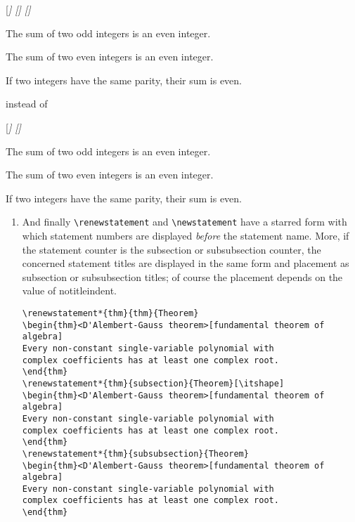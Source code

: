 \documentclass[english,ColorTheme=Red,FontSize=10pt]{tango}
\newcommand\TO[1]{\textsf{#1}}
\begin{document}
\begin{example}[Examples]
\begin{enumerate}[resume]
\end{enumerate}
[\itshape]
[\itshape]
[\itshape]
\setcounter{thm}{0}
\begin{propo}
The sum of two odd integers is an even integer.
\end{propo}
\begin{thm}
The sum of two even integers is an even integer.
\end{thm}
\begin{coro}
If two integers have the same parity, their sum is even.
\end{coro}


instead of 

\setcounter{thm}{0}\setcounter{propo}{0}
[\itshape]
[\itshape]
\begin{propo}
The sum of two odd integers is an even integer.
\end{propo}
\begin{thm}
The sum of two even integers is an even integer.
\end{thm}
\begin{coro}
If two integers have the same parity, their sum is even.
\end{coro}
\begin{enumerate}[resume]
\item And finally \verb+\renewstatement+ and \verb+\newstatement+ have a starred form with which statement numbers are displayed \emph{before} the statement name. More, if the statement counter is the subsection or subsubsection counter, the concerned statement titles are displayed in the same form and placement as subsection or subsubsection  titles; of course the placement depends on the value of \TO{notitleindent}.
\begin{tcolorbox}
\begin{verbatim}
\renewstatement*{thm}{thm}{Theorem}
\begin{thm}<D'Alembert-Gauss theorem>[fundamental theorem of algebra]
Every non-constant single-variable polynomial with
complex coefficients has at least one complex root.
\end{thm}
\renewstatement*{thm}{subsection}{Theorem}[\itshape]
\begin{thm}<D'Alembert-Gauss theorem>[fundamental theorem of algebra]
Every non-constant single-variable polynomial with
complex coefficients has at least one complex root.
\end{thm}
\renewstatement*{thm}{subsubsection}{Theorem}
\begin{thm}<D'Alembert-Gauss theorem>[fundamental theorem of algebra]
Every non-constant single-variable polynomial with
complex coefficients has at least one complex root.
\end{thm}
\end{verbatim}
\end{tcolorbox}
\end{enumerate}
\end{example}
\end{document}
